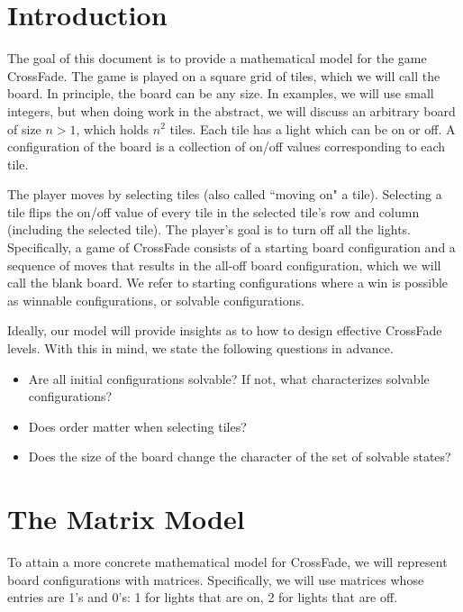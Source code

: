 \documentclass{article}[12pt]
\begin{document}
\section*{Introduction}

The goal of this document is to provide a mathematical model for the game CrossFade.  The game is played on a square grid of tiles, which we will call the board.  In principle, the board can be any size.  In examples, we will use small integers, but when doing work in the abstract, we will discuss an arbitrary board of size $n > 1$, which holds $n^2$ tiles.  Each tile has a light which can be on or off.  A configuration of the board is a collection of on/off values corresponding to each tile.

The player moves by selecting tiles (also called ``moving on" a tile).  Selecting a tile flips the on/off value of every tile in the selected tile's row and column (including the selected tile).  The player's goal is to turn off all the lights.  Specifically, a game of CrossFade consists of a starting board configuration and a sequence of moves that results in the all-off board configuration, which we will call the blank board.  We refer to starting configurations where a win is possible as winnable configurations, or solvable configurations.

Ideally, our model will provide insights as to how to design effective CrossFade levels.  With this in mind, we state the following questions in advance.

\begin{itemize}

\item Are all initial configurations solvable?  If not, what characterizes solvable configurations?

\item Does order matter when selecting tiles?

\item Does the size of the board change the character of the set of solvable states?

\end{itemize}

\section{The Matrix Model}

To attain a more concrete mathematical model for CrossFade, we will represent board configurations with matrices.  Specifically, we will use matrices whose entries are 1's and 0's: 1 for lights that are on, 2 for lights that are off.
\end{document}
